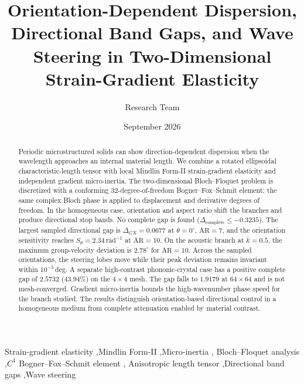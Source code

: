 \documentclass[5p,twocolumn]{elsarticle}
\begin{document}
\begin{frontmatter}

\title{Orientation-Dependent Dispersion, Directional Band Gaps, and Wave Steering in Two-Dimensional Strain-Gradient Elasticity}

\author{Research Team}
\address{Department of Mechanical Engineering / Metamaterials Laboratory}

\begin{abstract}
Periodic microstructured solids can show direction-dependent dispersion when the wavelength approaches an internal material length. We combine a rotated ellipsoidal characteristic-length tensor with local Mindlin Form-II strain-gradient elasticity and independent gradient micro-inertia. The two-dimensional Bloch--Floquet problem is discretized with a conforming 32-degree-of-freedom Bogner--Fox--Schmit element; the same complex Bloch phase is applied to displacement and derivative degrees of freedom. In the homogeneous case, orientation and aspect ratio shift the branches and produce directional stop bands. No complete gap is found ($\Delta_{\mathrm{complete}}\le -0.3235$). The largest sampled directional gap is $\Delta_{GX}=0.0677$ at $\theta=0^\circ$, $\mathrm{AR}=7$, and the orientation sensitivity reaches $S_\theta=2.34\,\mathrm{rad}^{-1}$ at $\mathrm{AR}=10$. On the acoustic branch at $\bar{k}=0.5$, the maximum group-velocity deviation is $2.78^\circ$ for $\mathrm{AR}=10$. Across the sampled orientations, the steering lobes move while their peak deviation remains invariant within $10^{-5}\,$deg. A separate high-contrast phononic-crystal case has a positive complete gap of $2.5732$ ($43.94\%$) on the $4\times4$ mesh. The gap falls to $1.9179$ at $64\times64$ and is not mesh-converged. Gradient micro-inertia bounds the high-wavenumber phase speed for the branch studied. The results distinguish orientation-based directional control in a homogeneous medium from complete attenuation enabled by material contrast.
\end{abstract}

\begin{keyword}
Strain-gradient elasticity \sep Mindlin Form-II \sep Micro-inertia \sep
Bloch--Floquet analysis \sep $C^1$ Bogner--Fox--Schmit element \sep
Anisotropic length tensor \sep Directional band gaps \sep Wave steering
\end{keyword}

\date{September 2026}

\end{frontmatter}
\end{document}
